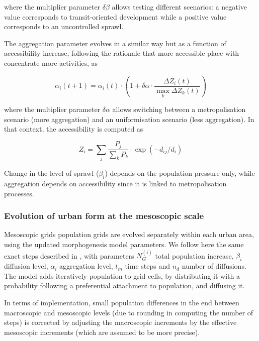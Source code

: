\documentclass[ijgi,article,submit,moreauthors,pdftex]{Definitions/mdpi}
\begin{document}
where the multiplier parameter $\delta\beta$ allows testing different scenarios: a negative value corresponds to transit-oriented development while a positive value corresponds to an uncontrolled sprawl.
			
The aggregation parameter evolves in a similar way but as a function of accessibility increase, following the rationale that more accessible place with concentrate more activities, as
 
\begin{equation}
	\label{eq:eq5}
	\alpha_i (t+1) = \alpha_i (t) \cdot \left(1 + \delta\alpha \cdot \frac{\Delta Z_i (t)}{\max_k  \Delta Z_k (t)}\right)
\end{equation}
			
where the multiplier parameter $\delta\alpha$ allows switching between a metropolisation scenario (more aggregation) and an uniformisation scenario (less aggregation). In that context, the accessibility is computed as
			
\begin{equation}
	\label{eq:eq5}
	Z_i = \sum_j \frac{P_j}{\sum_k P_k} \cdot \exp( - d_{ij} / d_i)
\end{equation}
			
Change in the level of sprawl ($\beta_i$) depends on the population pressure only, while aggregation depends on accessibility since it is linked to metropolisation processes.




\subsubsection{Evolution of urban form at the mesoscopic scale}
	
Mesoscopic grids population grids are evolved separately within each urban area, using the updated morphogenesis model parameters. We follow here the same exact steps described in \cite{raimbault2018calibration}, with parameters $N_G^{(i)}$ total population increase, $\beta_i$ diffusion level, $\alpha_i$ aggregation level, $t_m$ time steps and $n_d$ number of diffusions. The model adds iteratively population to grid cells, by distributing it with a probability following a preferential attachment to population, and diffusing it.

In terms of implementation, small population differences in the end between macroscopic and mesoscopic levels (due to rounding in computing the number of steps) is corrected by adjusting the macroscopic increments by the effective mesoscopic increments (which are assumed to be more precise).
	
\end{document}
